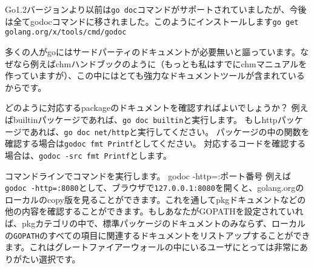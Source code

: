 Go1.2バージョンより以前は\texttt{go doc}コマンドがサポートされていましたが、今後は全てgodocコマンドに移されました。このようにインストールします\texttt{go get golang.org\//x\//tools\//cmd\//godoc}

多くの人がgoにはサードパーティのドキュメントが必要無いと謳っています。なぜなら例えばchmハンドブックのように（もっとも私はすでにchmマニュアルを作っていますが）、この中にはとても強力なドキュメントツールが含まれているからです。

どのように対応するpackageのドキュメントを確認すればよいでしょうか？ 例えばbuiltinパッケージであれば、\texttt{go doc builtin}と実行します。 もしhttpパッケージであれば、\texttt{go doc net\//http}と実行してください。 パッケージの中の関数を確認する場合は\texttt{godoc fmt Printf}としてください。 対応するコードを確認する場合は、\texttt{godoc -src fmt Printf}とします。

コマンドラインでコマンドを実行します。 godoc -http=:ポート番号 例えば\texttt{godoc -http=:8080}として、ブラウザで\texttt{127.0.0.1:8080}を開くと、golang.orgのローカルのcopy版を見ることができます。これを通してpkgドキュメントなどの他の内容を確認することができます。もしあなたがGOPATHを設定されていれば、pkgカテゴリの中で、標準パッケージのドキュメントのみならず、ローカルの\texttt{GOPATH}のすべての項目に関連するドキュメントをリストアップすることができます。これはグレートファイアーウォールの中にいるユーザにとっては非常にありがたい選択です。
